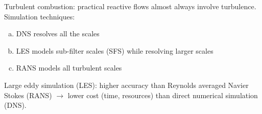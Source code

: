 \documentclass{beamer}
\begin{document}
\begin{frame}
\vspace{10pt}
\scriptsize
Turbulent combustion: practical reactive flows almost always involve turbulence.
\newline \newline
Simulation techniques: 
\begin{enumerate}[(a)]
\item DNS resolves all the scales 
\item LES models sub-filter scales (SFS) while resolving larger scales 
\item RANS models all turbulent scales 
\end{enumerate}
Large eddy simulation (LES): higher accuracy than Reynolds averaged Navier Stokes (RANS) $\rightarrow$ lower cost (time, resources) than direct numerical simulation (DNS).


\end{frame}
\end{document}
